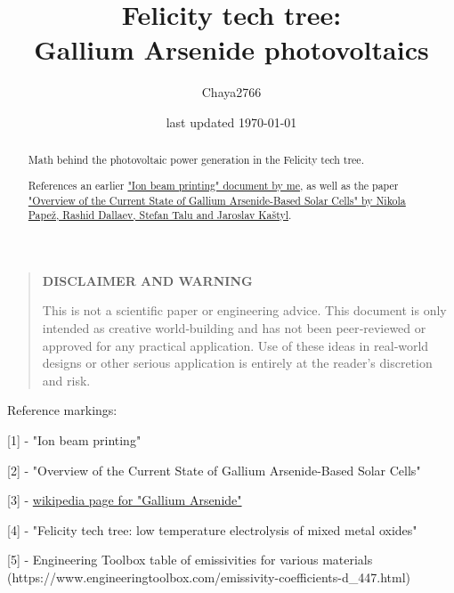 \documentclass[a4paper]{article}
\title{Felicity tech tree:\\Gallium Arsenide photovoltaics}
\author{Chaya2766}
\date{last updated \today}
\begin{document}
	\sffamily
	\hyphenchar{}
	\sloppy
	
	\maketitle
	
	\textbf{
		\sloppy
		\hyphenchar{}
		}
	
	\vfill
	
	\begin{abstract}
		Math behind the photovoltaic power generation in the Felicity tech tree.
		
		\medskip
		
		References an earlier \href{https://chaya2766.github.io/stareater-expanse-wiki/?page=documents/ion_beam_printing/ion_beam_printing.pdf}{"Ion beam printing" document by me}, as well as the paper \href{https://pmc.ncbi.nlm.nih.gov/articles/PMC8200097/pdf/materials-14-03075.pdf}{"Overview of the Current State of Gallium Arsenide-Based Solar Cells" by Nikola Papež, Rashid Dallaev, Stefan Talu and Jaroslav Kaštyl}.
	\end{abstract}
	
	\vfill
	
	\begin{quote}
		\begin{center}
			\textbf{DISCLAIMER AND WARNING}
		\end{center}
		
		This is not a scientific paper or engineering advice.
		This document is only intended as creative world‑building and has not been peer‑reviewed or approved for any practical application.
		Use of these ideas in real‑world designs or other serious application is entirely at the reader’s discretion and risk.
	\end{quote}
	
	\vfill
	
	\tableofcontents
	
	\vfill
	
	Reference markings:
	
	[1] - "Ion beam printing"
	
	[2] - "Overview of the Current State of Gallium Arsenide-Based Solar Cells"
	
	[3] - \href{https://en.wikipedia.org/wiki/Gallium_arsenide}{wikipedia page for "Gallium Arsenide"}
	
	[4] - "Felicity tech tree: low temperature electrolysis of mixed metal oxides"
	
	[5] - Engineering Toolbox table of emissivities for various materials \\ \indent (https://www.engineeringtoolbox.com/emissivity-coefficients-d\_447.html)
	
\end{document}
